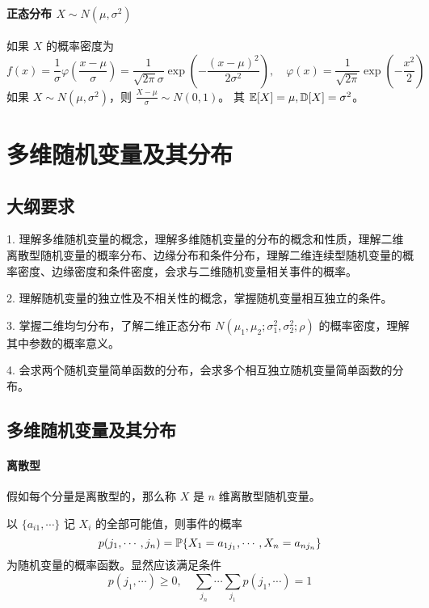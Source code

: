\paragraph{正态分布 $X \sim N(\mu, \sigma^2)$}
如果 $X$ 的概率密度为
\[ f(x) = \frac{1}{\sigma} \varphi\left(\frac{x - \mu}{\sigma}\right) = \frac{1}{\sqrt{2 \pi}  \sigma} \exp \left(- \frac{(x - \mu)^2}{2\sigma^2}  \right), \quad \varphi(x) = \frac{1}{\sqrt{2\pi}} \exp\left(-\frac{x^2}{2}\right) \]
如果 $X \sim N(\mu, \sigma^2)$，则 $\frac{X - \mu}{\sigma} \sim N(0, 1)$。
其 $\mathbb{E} [X] = \mu, \mathbb{D} [X] = \sigma^2$。


\section{多维随机变量及其分布}

\subsection{大纲要求}

1. 理解多维随机变量的概念，理解多维随机变量的分布的概念和性质，理解二维离散型随机变量的概率分布、边缘分布和条件分布，理解二维连续型随机变量的概率密度、边缘密度和条件密度，会求与二维随机变量相关事件的概率。

2. 理解随机变量的独立性及不相关性的概念，掌握随机变量相互独立的条件。

3. 掌握二维均匀分布，了解二维正态分布 $N(\mu_1, \mu_2; \sigma_1^2, \sigma_2^2; \rho)$ 的概率密度，理解其中参数的概率意义。

4. 会求两个随机变量简单函数的分布，会求多个相互独立随机变量简单函数的分布。

\subsection{多维随机变量及其分布}

\paragraph{离散型}

假如每个分量是离散型的，那么称 $X$ 是 $n$ 维离散型随机变量。

\begin{definition}
	以 $\{a_{i1}, \cdots\}$ 记 $X_i$ 的全部可能值，则事件的概率
	\[ p(j_1,\cdots,j_n) = \mathbb{P}\{X_1 = a_{1j_1}, \cdots, X_n = a_{n j_n}\} \]
	为随机变量的概率函数。显然应该满足条件
	\[ p(j_1, \cdots) \geqslant 0, \quad \sum_{j_n} \cdots \sum_{j_1} p(j_1, \cdots)  =1 \]
\end{definition}

